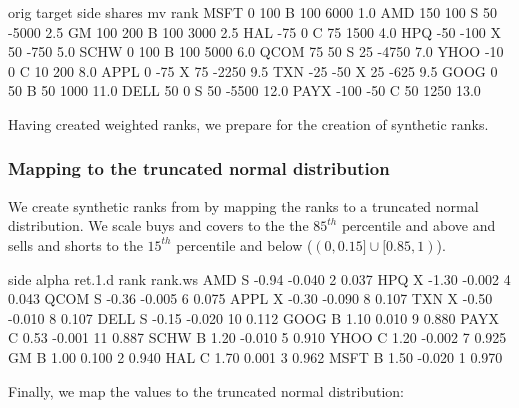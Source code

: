 \documentclass{article}
\begin{document}
\begin{Schunk}
\begin{Soutput}
     orig target side shares    mv rank
MSFT    0    100    B    100  6000  1.0
AMD   150    100    S     50 -5000  2.5
GM    100    200    B    100  3000  2.5
HAL   -75      0    C     75  1500  4.0
HPQ   -50   -100    X     50  -750  5.0
SCHW    0    100    B    100  5000  6.0
QCOM   75     50    S     25 -4750  7.0
YHOO  -10      0    C     10   200  8.0
APPL    0    -75    X     75 -2250  9.5
TXN   -25    -50    X     25  -625  9.5
GOOG    0     50    B     50  1000 11.0
DELL   50      0    S     50 -5500 12.0
PAYX -100    -50    C     50  1250 13.0
\end{Soutput}
\end{Schunk}

Having created weighted ranks, we prepare for the creation of
synthetic ranks.

\subsubsection{Mapping to the truncated normal distribution}

We create synthetic ranks from by mapping the ranks to a truncated
normal distribution.  We scale buys and covers to the the $85^{th}$
percentile and above and sells and shorts to the $15^{th}$ percentile
and below ($(0, 0.15]\cup[0.85,1)$).

\begin{Schunk}
\begin{Soutput}
     side alpha ret.1.d rank rank.ws
AMD     S -0.94  -0.040    2   0.037
HPQ     X -1.30  -0.002    4   0.043
QCOM    S -0.36  -0.005    6   0.075
APPL    X -0.30  -0.090    8   0.107
TXN     X -0.50  -0.010    8   0.107
DELL    S -0.15  -0.020   10   0.112
GOOG    B  1.10   0.010    9   0.880
PAYX    C  0.53  -0.001   11   0.887
SCHW    B  1.20  -0.010    5   0.910
YHOO    C  1.20  -0.002    7   0.925
GM      B  1.00   0.100    2   0.940
HAL     C  1.70   0.001    3   0.962
MSFT    B  1.50  -0.020    1   0.970
\end{Soutput}
\end{Schunk}

Finally, we map the values to the truncated normal distribution:
\end{document}
